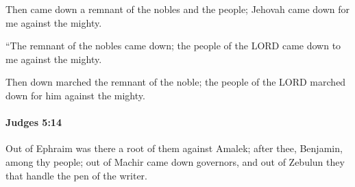 			\begin{versebox}
					\item[BHS] 
					\item[ASV] Then came down a remnant of the nobles and the people; Jehovah came down for me against the mighty.
					\item[NIV] “The remnant of the nobles came down; the people of the LORD came down to me against the mighty.
					\item[NRSV] Then down marched the remnant of the noble; the people of the LORD marched down for him against the mighty.
			\end{versebox}

		\paragraph{Judges 5:14} %
			\label{JUDGES-5-14}

			Out of Ephraim was there a root of them against Amalek; after thee, Benjamin, among thy people; out of Machir came down governors, and out of Zebulun they that handle the pen of the writer.

